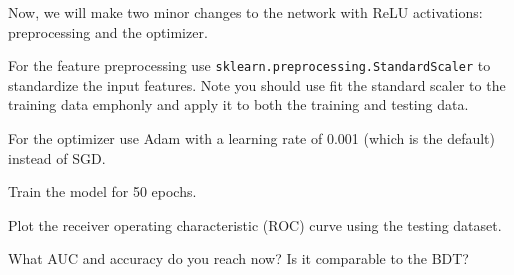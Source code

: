 \begin{problem}[5]
Now, we will make two minor changes to the network with ReLU activations: preprocessing and the optimizer.

For the feature preprocessing use \texttt{sklearn.preprocessing.StandardScaler} to standardize the input features.
Note you should use fit the standard scaler to the training data emph{only} and apply it to both the training and testing data.

For the optimizer use Adam with a learning rate of 0.001 (which is the default) instead of SGD.

Train the model for 50 epochs.

Plot the receiver operating characteristic (ROC) curve using the testing dataset.

What AUC and accuracy do you reach now?
Is it comparable to the BDT?
\end{problem}




